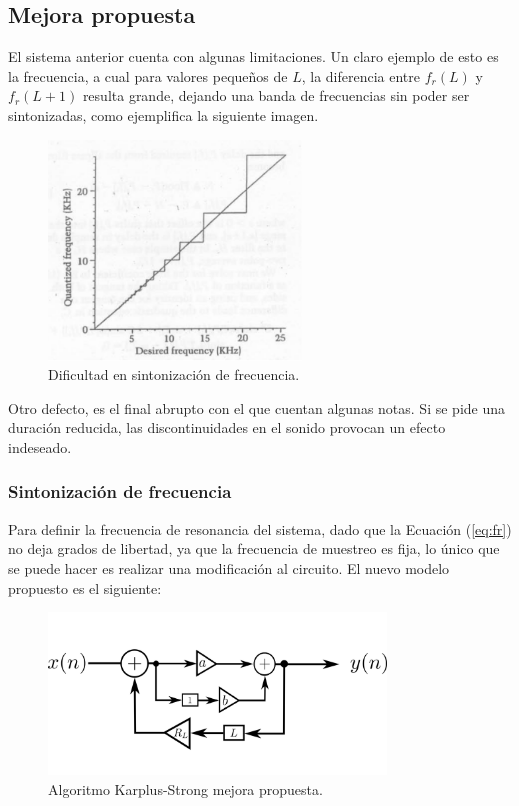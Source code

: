 \subsection{Mejora propuesta}
El sistema anterior cuenta con algunas limitaciones. Un claro ejemplo de esto es la frecuencia,
a cual para valores pequeños de $L$, la diferencia entre $f_r(L)$ y $f_r(L+1)$ resulta grande, dejando una banda de frecuencias sin poder ser sintonizadas, como ejemplifica la siguiente imagen.
\begin{figure}[H]	
	\centering
	\includegraphics[width=0.6\textwidth]{ImagenesEjercicio4/sintfreq.PNG}
	\caption{Dificultad en sintonización de frecuencia.}
	\label{fig:sintfreq}
\end{figure}

Otro defecto, es el final abrupto con el que cuentan algunas notas. Si se pide una duración reducida,  las discontinuidades en el sonido provocan un efecto indeseado.

\subsubsection{Sintonización de frecuencia}
Para definir la frecuencia de resonancia del sistema, dado que la Ecuación (\ref{eq:fr}) no deja grados de libertad, ya que la frecuencia de muestreo es fija, lo único que se puede hacer es realizar una modificación al circuito. El nuevo modelo propuesto es el siguiente:
\begin{figure}[H]
	\centering
	\includegraphics[width=0.8\textwidth]{ImagenesEjercicio4/mejoraks.PNG}
	\caption{Algoritmo Karplus-Strong mejora propuesta.}
	\label{fig:ksmejora}
\end{figure}

